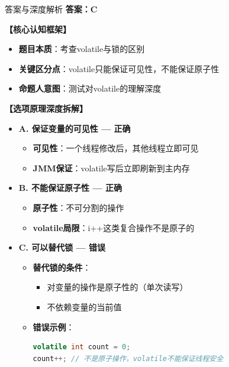 \documentclass[12pt, a4paper]{ctexart}
\begin{document}
\begin{enumerate}[label=\textbf{\arabic*.}]
	      \begin{bluebox}{答案与深度解析}
		      \textbf{答案：C}

		      \textbf{【核心认知框架】}
		      \begin{itemize}[label={}, leftmargin=*, nosep]
			      \item \textbf{题目本质}：考查volatile与锁的区别
			      \item \textbf{关键区分点}：volatile只能保证可见性，不能保证原子性
			      \item \textbf{命题人意图}：测试对volatile的理解深度
		      \end{itemize}

		      \textbf{【选项原理深度拆解】}
					  \begin{itemize}[label={}, leftmargin=*, nosep]

		      \item \textbf{A. 保证变量的可见性 — 正确}
		      \begin{itemize}[label={}, leftmargin=*, nosep]
			      \item \textbf{可见性}：一个线程修改后，其他线程立即可见
			      \item \textbf{JMM保证}：volatile写后立即刷新到主内存
		      \end{itemize}

		      \item \textbf{B. 不能保证原子性 — 正确}
		      \begin{itemize}[label={}, leftmargin=*, nosep]
			      \item \textbf{原子性}：不可分割的操作
			      \item \textbf{volatile局限}：i++这类复合操作不是原子的
		      \end{itemize}

		      \item \textbf{C. 可以替代锁 — 错误}
		      \begin{itemize}[label={}, leftmargin=*, nosep]
			      \item \textbf{替代锁的条件}：
			            \begin{itemize}[label={}, nosep]
				            \item 对变量的操作是原子性的（单次读写）
				            \item 不依赖变量的当前值
			            \end{itemize}
			      \item \textbf{错误示例}：
			            \begin{lstlisting}[language=Java]
volatile int count = 0;
count++; // 不是原子操作，volatile不能保证线程安全
      \end{lstlisting}
		      \end{itemize}


\end{itemize}
\end{bluebox}
\end{enumerate}
\end{document}
